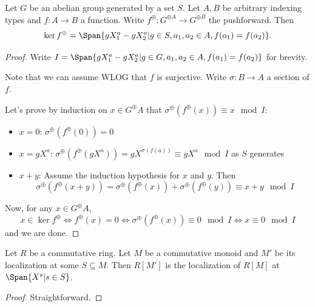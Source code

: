 \begin{proposition}
  \label{0-ker-mon-alg}

  Let $G$ be an abelian group generated by a set $S$.
  Let $A, B$ be arbitrary indexing types and $f : A \to B$ a function.
  Write $f^\oplus : G^{\oplus A} \to G^{\oplus B}$ the pushforward.
  Then
  \[
    \ker f^\oplus = \Span\{gX^a_1 - gX^a_2 | g \in S, a_1, a_2 \in A, f(a_1) = f(a_2)\}.
  \]
\end{proposition}
\begin{proof}

  Write $I = \Span\{gX^a_1 - gX^a_2 | g \in G, a_1, a_2 \in A, f(a_1) = f(a_2)\}$ for brevity.

  Note that we can assume WLOG that $f$ is surjective.
  Write $\sigma : B \to A$ a section of $f$.

  Let's prove by induction on $x \in G^\oplus A$ that $\sigma^\oplus(f^\oplus(x)) \equiv x \mod I$:
  \begin{itemize}
    \item $x = 0$: $\sigma^\oplus(f^\oplus(0)) = 0$
    \item $x = gX^a$:
      $\sigma^\oplus(f^\oplus(gX^a)) = gX^{\sigma(f(a))} \equiv gX^a \mod I$ as $S$ generates
    \item $x + y$: Assume the induction hypothesis for $x$ and $y$. Then
      \[
        \sigma^\oplus(f^\oplus(x + y)) = \sigma^\oplus(f^\oplus(x)) + \sigma^\oplus(f^\oplus(y))
          \equiv x + y \mod I
      \]
  \end{itemize}

  Now, for any $x \in G^\oplus A$,
  \[
    x \in \ker f^\oplus \iff f^\oplus(x) = 0 \iff
      \sigma^\oplus(f^\oplus(x)) \equiv 0 \mod I \iff x \equiv 0 \mod I
  \]
  and we are done.
\end{proof}


\begin{proposition}
  \label{0-loc-mon-alg}

  Let $R$ be a commutative ring.
  Let $M$ be a commutative monoid and $M'$ be its localization at some $S \subseteq M$.
  Then $R[M']$ is the localization of $R[M]$ at $\Span \{X^s | s \in S\}$.
\end{proposition}
\begin{proof}

  Straightforward.
\end{proof}


